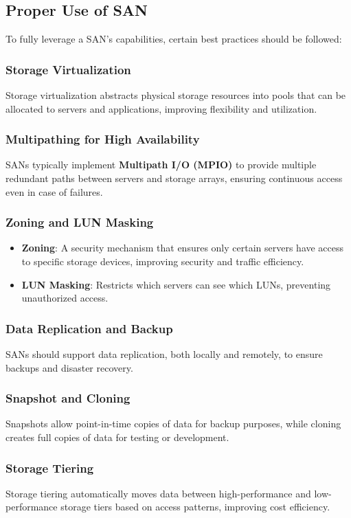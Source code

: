 \documentclass{article}
\begin{document}
\subsection{Proper Use of SAN}
To fully leverage a SAN's capabilities, certain best practices should be followed:

\subsubsection{Storage Virtualization}
Storage virtualization abstracts physical storage resources into pools that can be allocated to servers and applications, improving flexibility and utilization.

\subsubsection{Multipathing for High Availability}
SANs typically implement \textbf{Multipath I/O (MPIO)} to provide multiple redundant paths between servers and storage arrays, ensuring continuous access even in case of failures.

\subsubsection{Zoning and LUN Masking}
\begin{itemize}
    \item \textbf{Zoning}: A security mechanism that ensures only certain servers have access to specific storage devices, improving security and traffic efficiency.
    \item \textbf{LUN Masking}: Restricts which servers can see which LUNs, preventing unauthorized access.
\end{itemize}

\subsubsection{Data Replication and Backup}
SANs should support data replication, both locally and remotely, to ensure backups and disaster recovery.

\subsubsection{Snapshot and Cloning}
Snapshots allow point-in-time copies of data for backup purposes, while cloning creates full copies of data for testing or development.

\subsubsection{Storage Tiering}
Storage tiering automatically moves data between high-performance and low-performance storage tiers based on access patterns, improving cost efficiency.
\end{document}
